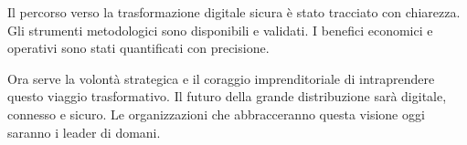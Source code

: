 Il percorso verso la trasformazione digitale sicura è stato tracciato con chiarezza. Gli strumenti metodologici sono disponibili e validati. I benefici economici e operativi sono stati quantificati con precisione. 

Ora serve la volontà strategica e il coraggio imprenditoriale di intraprendere questo viaggio trasformativo. Il futuro della grande distribuzione sarà digitale, connesso e sicuro. Le organizzazioni che abbracceranno questa visione oggi saranno i leader di domani.

